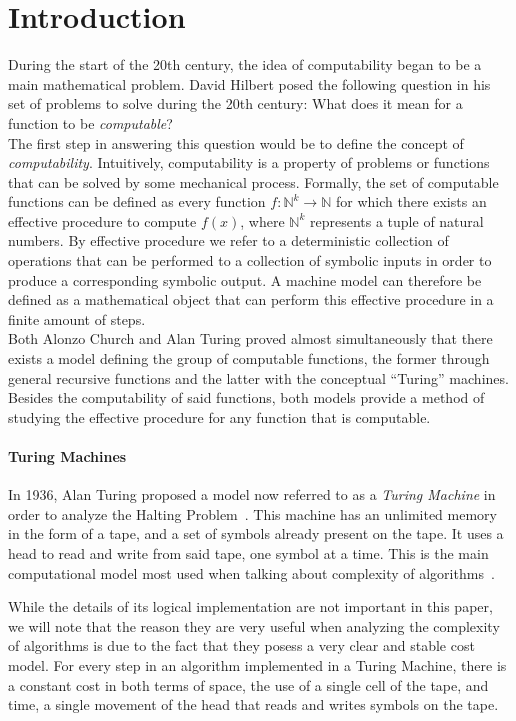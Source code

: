 \documentclass[11pt]{article}
\begin{document}
\section{Introduction}
During the start of the 20th century, the idea of computability began to be a main mathematical problem. David Hilbert posed the following question in his set of problems to solve during the 20th century: What does it mean for a function to be \textit{computable}? \\
The first step in answering this question would be to define the concept of \textit{computability}. Intuitively, computability is a property of problems or functions that can be solved by some mechanical process. Formally, the set of computable functions can be defined as every function $f : \mathbb{N}^k \rightarrow \mathbb{N}$ for which there exists an effective procedure to compute $f(x)$, where $\mathbb{N}^k$ represents a tuple of natural numbers. By effective procedure we refer to a deterministic collection of operations that can be performed to a collection of symbolic inputs in order to produce a corresponding symbolic output. A machine model can therefore be defined as a mathematical object that can perform this effective procedure in a finite amount of steps.\\
 Both Alonzo Church and Alan Turing proved almost simultaneously that there exists a model defining the group of computable functions, the former through general recursive functions and the latter with the conceptual \enquote{Turing} machines.
 Besides the computability of said functions, both models provide a method of studying the effective procedure for any function that is computable.

\paragraph{Turing Machines}
In 1936, Alan Turing proposed a model now referred to as a \textit{Turing Machine} in order to analyze the Halting Problem~\cite{on-computable-numbers}. This machine has an unlimited memory in the form of a tape, and a set of symbols already present on the tape. It uses a head to read and write from said tape, one symbol at a time. This is the main computational model most used when talking about complexity of algorithms~\cite{computation-theory}.

While the details of its logical implementation are not important in this paper, we will note that the reason they are very useful when analyzing the complexity of algorithms is due to the fact that they posess a very clear and stable cost model. For every step in an algorithm implemented in a Turing Machine, there is a constant cost in both terms of space, the use of a single cell of the tape, and time, a single movement of the head that reads and writes symbols on the tape.
\end{document}
